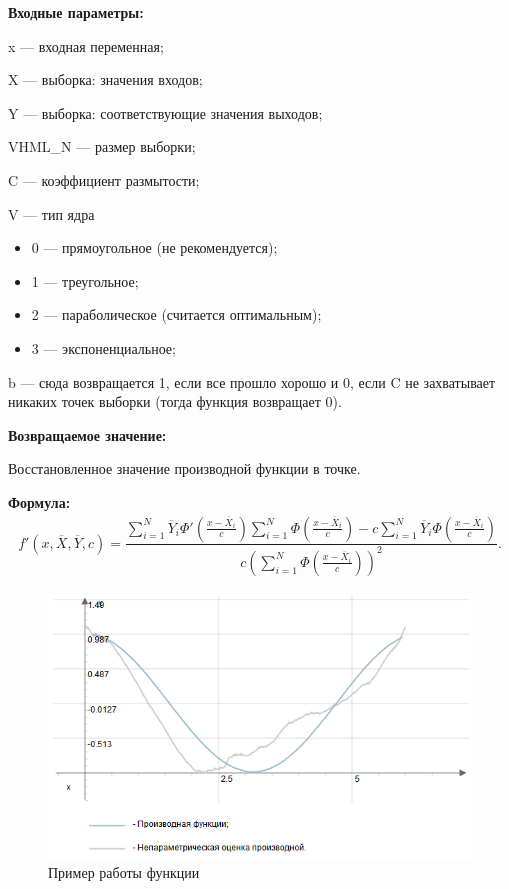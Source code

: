 \textbf{Входные параметры:} 
 
x --- входная переменная;
 
X --- выборка: значения входов;
 
Y --- выборка: соответствующие значения выходов;
 
VHML\_N --- размер выборки;
 
C --- коэффициент размытости;
 
V --- тип ядра
 
 \begin{itemize}
 \item  0 --- прямоугольное (не рекомендуется);
 \item  1 --- треугольное;
 \item  2 --- параболическое (считается оптимальным);
 \item  3 --- экспоненциальное;
 \end{itemize}
 
b --- сюда возвращается 1, если все прошло хорошо и 0, если C не захватывает никаких точек выборки (тогда функция возвращает 0).

\textbf{Возвращаемое значение:}
 
 Восстановленное значение производной функции в точке.

\textbf{Формула:}
\begin{eqnarray*}
{f}'\left( x, \overline{X},\overline{Y}, c\right) =\dfrac{\sum_{i=1}^{N}\overline{Y}_i{\Phi}'\left( \frac{x-\overline{X}_i}{c}\right) \sum_{i=1}^{N}\Phi\left( \frac{x-\overline{X}_i}{c}\right)-c \sum_{i=1}^{N}\overline{Y}_i\Phi\left( \frac{x-\overline{X}_i}{c}\right)}{c\left( \sum_{i=1}^{N}\Phi\left( \frac{x-\overline{X}_i}{c}\right)\right)^2 }.
\end{eqnarray*}

 \begin{figure} [h] 
   \center
   \includegraphics {HML_NonparametricEstimatorOfDerivative4.png}
   \caption{Пример работы функции} 
   \label{img:HML_NonparametricEstimatorOfDerivative4}  
 \end{figure}